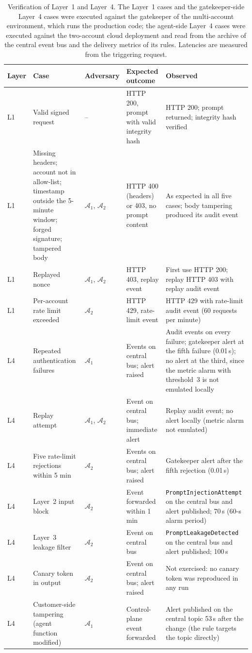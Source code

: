\begin{table}[t]
\caption{\label{tab:l1-l4-verification}Verification of Layer~1 and Layer~4. The Layer~1 cases and the gatekeeper-side Layer~4 cases were executed against the gatekeeper of the multi-account environment, which runs the production code; the agent-side Layer~4 cases were executed against the two-account cloud deployment and read from the archive of the central event bus and the delivery metrics of its rules. Latencies are measured from the triggering request.}
\centering
\scriptsize
\setlength{\tabcolsep}{3pt}
\begin{tabular}{@{}lp{3.6cm}p{1cm}p{3.4cm}p{5.2cm}@{}}
\toprule
\textbf{Layer} & \textbf{Case} & \textbf{Adversary} & \textbf{Expected outcome} & \textbf{Observed} \\
\midrule
L1 & Valid signed request & -- & HTTP 200, prompt with valid integrity hash & HTTP 200; prompt returned; integrity hash verified \\
L1 & Missing headers; account not in allow-list; timestamp outside the 5-minute window; forged signature; tampered body & $\mathcal{A}_1$, $\mathcal{A}_2$ & HTTP 400 (headers) or 403, no prompt content & As expected in all five cases; body tampering produced its audit event \\
L1 & Replayed nonce & $\mathcal{A}_1$, $\mathcal{A}_2$ & HTTP 403, replay event & First use HTTP 200; replay HTTP 403 with replay audit event \\
L1 & Per-account rate limit exceeded & $\mathcal{A}_2$ & HTTP 429, rate-limit event & HTTP 429 with rate-limit audit event (60 requests per minute) \\
\midrule
L4 & Repeated authentication failures & $\mathcal{A}_1$ & Events on central bus; alert raised & Audit events on every failure; gatekeeper alert at the fifth failure (0.01\,s); no alert at the third, since the metric alarm with threshold~3 is not emulated locally \\
L4 & Replay attempt & $\mathcal{A}_1$, $\mathcal{A}_2$ & Event on central bus; immediate alert & Replay audit event; no alert locally (metric alarm not emulated) \\
L4 & Five rate-limit rejections within 5 min & $\mathcal{A}_2$ & Events on central bus; alert raised & Gatekeeper alert after the fifth rejection (0.01\,s) \\
L4 & Layer~2 input block & $\mathcal{A}_2$ & Event forwarded within 1 min & \texttt{PromptInjectionAttempt} on the central bus and alert published; 70\,s (60-s alarm period) \\
L4 & Layer~3 leakage filter & $\mathcal{A}_2$ & Event on central bus & \texttt{PromptLeakageDetected} on the central bus and alert published; 100\,s \\
L4 & Canary token in output & $\mathcal{A}_2$ & Event on central bus; alert raised & Not exercised: no canary token was reproduced in any run \\
L4 & Customer-side tampering (agent function modified) & $\mathcal{A}_1$ & Control-plane event forwarded & Alert published on the central topic 53\,s after the change (the rule targets the topic directly) \\
\bottomrule
\end{tabular}
\end{table}
